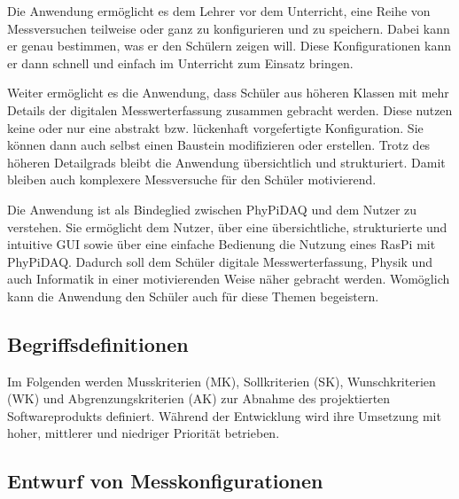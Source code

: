 \documentclass[parskip=full]{scrartcl}
\begin{document}
Die Anwendung ermöglicht es dem Lehrer vor dem Unterricht, eine Reihe von Messversuchen teilweise oder ganz zu konfigurieren und zu speichern. Dabei kann er genau bestimmen, was er den Schülern zeigen will. Diese Konfigurationen kann er dann schnell und einfach im Unterricht zum Einsatz bringen. 

Weiter ermöglicht es die Anwendung, dass Schüler aus höheren Klassen mit mehr Details der digitalen Messwerterfassung zusammen gebracht werden. Diese nutzen keine oder nur eine abstrakt bzw. lückenhaft vorgefertigte Konfiguration. Sie können dann auch selbst einen Baustein modifizieren oder erstellen. Trotz des höheren Detailgrads bleibt die Anwendung übersichtlich und strukturiert. Damit bleiben auch komplexere Messversuche für den Schüler motivierend. 

Die Anwendung ist als Bindeglied zwischen \gls{PhyPiDAQ} und dem Nutzer zu verstehen. Sie ermöglicht dem Nutzer, über eine übersichtliche, strukturierte und intuitive GUI sowie über eine einfache Bedienung die Nutzung eines \gls{RasPi} mit \gls{PhyPiDAQ}. Dadurch soll dem Schüler digitale Messwerterfassung, Physik und auch Informatik in einer motivierenden Weise näher gebracht werden. Womöglich kann die Anwendung den Schüler auch für diese Themen begeistern.  

\subsection{Begriffsdefinitionen}

Im Folgenden werden \gls{Musskriterien} (MK), \gls{Sollkriterien} (SK), \gls{Wunschkriterien} (WK) und \gls{Abgrenzungskriterien} (AK) zur Abnahme des projektierten Softwareprodukts definiert. Während der Entwicklung wird ihre Umsetzung mit hoher, mittlerer und niedriger Priorität betrieben.

\newtheorem{MussKrit}{MK}
\newtheorem{SollKrit}{SK}
\newtheorem{WunschKrit}{WK}


\subsection{Entwurf von Messkonfigurationen}
\end{document}
